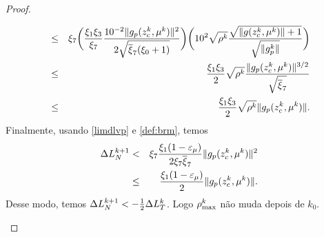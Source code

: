 \begin{proof}
\begin{description}
\begin{eqnarray*}
  & \leq & \xi_7\bigg(\frac{\xi_1\xi_3}{\xi_7}
    \frac{10^{-2}\Vert g_p(z_c^{k},\mu^k)\Vert^2} {2\sqrt{\overline{\xi}_7(\xi_0+1)} } \bigg)
    \bigg(10^2\sqrt{\rho^k}\frac{\sqrt{\Vert g(z_c^{k},\mu^k)\Vert + 1}}
    {\sqrt{\Vert g_p^{k}\Vert}}\bigg) \\ 
  & \leq & \frac{\xi_1\xi_3}{2} \sqrt{\rho^k}
    \frac{\Vert g_p(z_c^{k},\mu^k)\Vert^{3/2}} { \sqrt{\overline{\xi}_7} } \\ 
  & \leq & \frac{\xi_1\xi_3}{2}\sqrt{\rho^k}\Vert g_p(z_c^{k},\mu^k)\Vert. 
\end{eqnarray*}
    Finalmente, usando \eqref{limdlvp} e \eqref{def:brm}, temos
\begin{eqnarray*} 
  \Delta L_N^{k+1} & < & \xi_7\frac{\xi_1(1 - \varepsilon_{\mu})}
    {2\xi_7\overline{\xi}_7}\Vert g_p(z_c^{k},\mu^k)\Vert^2 \\ 
  & \leq & \frac{\xi_1(1 - \varepsilon_{\mu})}{2}\Vert g_p(z_c^{k},\mu^k)\Vert. 
\end{eqnarray*} 
Desse modo, temos
  $\Delta L_N^{k+1} < -\frac{1}{2}\Delta L_T^{k}$. Logo $\rho_{\max}^k$ não muda depois de $k_0$.
  \end{description} \end{proof}


